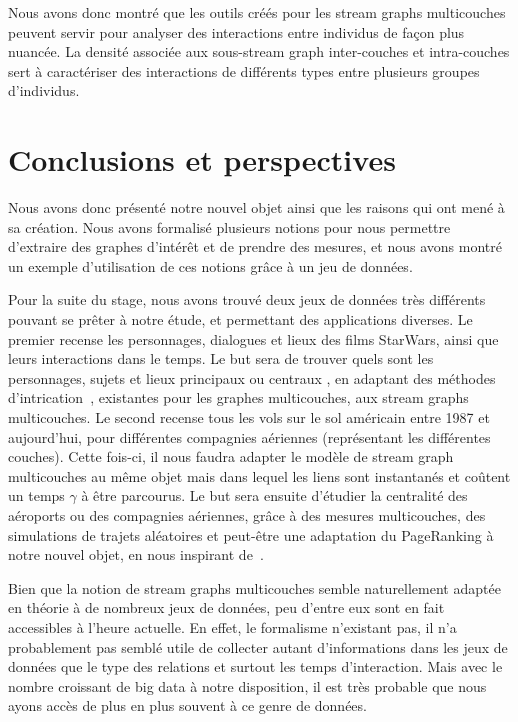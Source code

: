\documentclass[11pt,a4paper]{article}
\theoremstyle{definition}
\theoremstyle{remark}
\theoremstyle{remark}
\def \stg {stream graph}
\def \stgm {stream graph multicouches}
\def \stgms {stream graphs multicouches}
\begin{document}
Nous avons donc montré que les outils créés pour les \stgms{} peuvent servir pour analyser des interactions entre individus de façon plus nuancée. La densité associée aux sous-\stg{} inter-couches et intra-couches sert à caractériser des interactions de différents types entre plusieurs groupes d'individus.


\section{Conclusions et perspectives}

    Nous avons donc présenté notre nouvel objet ainsi que les raisons qui ont mené à sa création. Nous avons formalisé plusieurs notions pour nous permettre d'extraire des graphes d'intérêt et de prendre des mesures, et nous avons montré un exemple d'utilisation de ces notions grâce à un jeu de données.
    
    Pour la suite du stage, nous avons trouvé deux jeux de données très différents pouvant se prêter à notre étude, et permettant des applications diverses.
    Le premier recense les personnages, dialogues et lieux des films StarWars, ainsi que leurs interactions dans le temps. Le but sera de \og trouver \fg{} quels sont les personnages, sujets et lieux \og principaux \fg{} ou \og centraux \fg{}, en adaptant des méthodes d'intrication~\cite{intrication}, existantes pour les graphes multicouches, aux \stgms{}.
    Le second recense tous les vols sur le sol américain entre 1987 et aujourd'hui, pour différentes compagnies aériennes (représentant les différentes couches). Cette fois-ci, il nous faudra adapter le modèle de \stgm{} au même objet mais dans lequel les liens sont \og instantanés \fg{} et coûtent un temps $\gamma$ à être parcourus. Le but sera ensuite d'étudier la \og centralité \fg{} des aéroports ou des compagnies aériennes, grâce à des mesures multicouches, des simulations de trajets aléatoires et peut-être une adaptation du PageRanking à notre nouvel objet, en nous inspirant de~\cite{centraliteMulti}.
    
    Bien que la notion de \stgms{} semble naturellement adaptée en théorie à de nombreux jeux de données, peu d'entre eux sont en fait accessibles à l'heure actuelle. En effet, le formalisme n'existant pas, il n'a probablement pas semblé utile de collecter autant d'informations dans les jeux de données que le type des relations et surtout les temps d'interaction. Mais avec le nombre croissant de \og big data \fg{} à notre disposition, il est très probable que nous ayons accès de plus en plus souvent à ce genre de données.

    \nocite{*}
    
	
\end{document}
